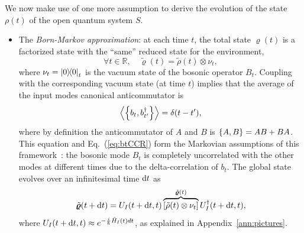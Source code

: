 We now make use of one more assumption to derive the evolution of the state $\rho(t)$ of the open quantum system $S$.
\begin{itemize}
    \item The \textit{Born-Markov approximation}: at each time $t$, the total state $\bm{\varrho}(t)$ is a factorized state with the ``same'' reduced state for the environment, 
    \begin{equation}
        \forall t\in\mathbb{R},\quad\tilde{\bm{\varrho}}(t)=\tilde{\rho}(t)\otimes \nu_t,
    \end{equation}
    where $\nu_t=\ketbra{0}_t$ is the vacuum state of the bosonic operator $B_t$. Coupling with the corresponding vacuum state (at time $t$) implies that the average of the input modes canonical anticommutator is
    \begin{equation}
        \expval{\qty{b_t,b_{t'}^\dagger}}=\delta(t-t'),
    \end{equation}
    where by definition the anticommutator of $A$ and $B$ is $\qty{A,B}=AB+BA$. This equation and Eq.~(\ref{eq:btCCR}) form the Markovian assumptions of this framework~\cite{Albarelli}: the bosonic mode $B_t$ is completely uncorrelated with the other modes at different times due to the delta-correlation of $b_t$.
The global state evolves over an infinitesimal time $\mathrm{d}t$ as
\begin{equation}\label{eq:rhoTevol}
    \tilde{\bm{\varrho}}(t+\mathrm{d}t)=U_I(t+\mathrm{d}t,t)\overbrace{\qty[\tilde{\rho}(t)\otimes \nu_t]}^{\tilde{\bm{\varrho}}(t)}U_I^\dagger(t+\mathrm{d}t,t),
\end{equation}
where $U_I(t+\mathrm{d}t,t)\approx e^{-\frac{i}{\hbar}\tilde{H}_I(t)dt}$, as explained in Appendix~\ref{ann:pictures}.
\end{itemize}
